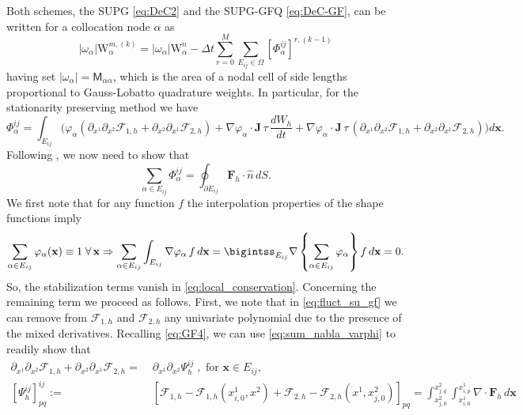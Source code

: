 \documentclass[a4paper,10pt]{article}
\begin{document}
Both schemes, the SUPG \eqref{eq:DeC2} and the SUPG-GFQ \eqref{eq:DeC-GF}, can be written for a collocation node $\alpha$ as 
\begin{equation}\label{eq:DeC-RD}
|\omega_{\alpha} |\mathrm{W}^{m,(k)}_{\alpha} = |\omega_{\alpha}| \mathrm{W}^n_{\alpha} - \Delta t \sum_{r=0}^M \sum_{E_{ij}\in \Omega} [\Phi_{\alpha}^{ij}]^{r,(k-1)}
\end{equation}
having set $|\omega_{\alpha}|=\mathsf{M}_{\alpha\alpha}$, which is the area of a nodal cell of side lengths  proportional to Gauss-Lobatto   quadrature  weights. 
In particular, for the stationarity preserving method we  have
\begin{equation}\label{eq:fluct_su_gf}
\Phi_{\alpha}^{ij} = \int_{E_{ij}} \Big( \varphi_{\alpha} ( \partial_{x^1} \partial_{x^2} \mathcal{F}_{1,h} + \partial_{x^2}\partial_{x^1} \mathcal{F}_{2,h}) + \nabla\varphi_{\alpha} \cdot\mathbf{J}\,\tau\,\dfrac{d W_h }{dt} +   \nabla\varphi_{\alpha} \cdot\mathbf{J}\,\tau\, ( \partial_{x^1} \partial_{x^2} \mathcal{F}_{1,h} + \partial_{x^2}\partial_{x^1} \mathcal{F}_{2,h})\Big)d\mathbf{x} .
\end{equation}
Following \cite{amr2025}, we now need to show that 
\begin{equation}\label{eq:local_conservation}
\sum_{\alpha\in E_{ij}} \Phi_{\alpha}^{ij} = \oint_{\partial E_{ij}} \! \!\mathbf{F}_h\cdot \hat{n}\, dS.
\end{equation}
We first note that for any function $f$ the interpolation properties of the shape functions imply  
\begin{equation}\label{eq:sum_nabla_varphi}
\sum_{\alpha\in E_{ij}}  \varphi_{\alpha}(\mathbf{x}) \equiv 1\;\forall\, \mathbf{x} \Rightarrow \sum_{\alpha\in E_{ij}} \int_{E_{ij}}  \nabla\varphi_{\alpha} \, f\,d\mathbf{x} = \bigintss_{E_{ij}}  \nabla \left\{\sum_{\alpha\in E_{ij}}  \varphi_{\alpha} \right\}   f\,d\mathbf{x}  =0.
\end{equation}
So, the stabilization terms vanish in \eqref{eq:local_conservation}. Concerning the remaining term we proceed as follows.  First, we note that in \eqref{eq:fluct_su_gf} we can remove from  $\mathcal{F}_{1,h}$ and $\mathcal{F}_{2,h}$  any univariate polynomial due to the presence of the mixed derivatives.
 Recalling \eqref{eq:GF4}, we can use \eqref{eq:sum_nabla_varphi} to readily show that
 \begin{equation}\label{eq:Phi_gf}
 \begin{aligned}
  \partial_{x^1} \partial_{x^2} \mathcal{F}_{1,h} + \partial_{x^2}\partial_{x^1} \mathcal{F}_{2,h} =   & \; \partial_{x^1} \partial_{x^2}\Psi^{ij}_h\;, \text{ for }\mathbf{x} \in E_{ij},  \\
[  \Psi^{ij}_h]^{ij}_{pq} := &\;[\mathcal{F}_{1,h} - \mathcal{F}_{1,h}(x^1_{i,0},x^2) + \mathcal{F}_{2,h} - \mathcal{F}_{2,h}(x^1, x^2_{j,0})]_{pq} =  \int_{x^2_{j,0}}^{x^2_{j,q}} \int_{x^1_{i,0}}^{x^1_{i,p}} \nabla\cdot\mathbf{F}_h\,d\mathbf{x}
  \end{aligned}
 \end{equation}
\end{document}
